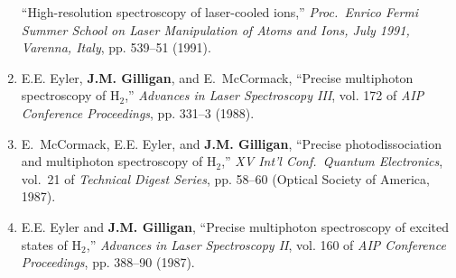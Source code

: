 \begin{enumerate}
    \enquote{High-resolution spectroscopy of laser-cooled ions,}  
    \emph{Proc.\ Enrico Fermi Summer School on Laser Manipulation of Atoms and
    Ions, {J}uly 1991, {V}arenna, {I}taly}, pp. 539--51 (1991). 
%
    \item
    E.E. Eyler, \textbf{J.M. Gilligan}, and E.~McCormack, 
    \enquote{Precise multiphoton spectroscopy of {H$_2$},}  
    \emph{Advances in Laser Spectroscopy III}, vol. 172 of \emph{AIP Conference Proceedings}, pp. 331--3 (1988). 
%
    \item
    E.~McCormack, E.E. Eyler, and \textbf{J.M. Gilligan}, 
    \enquote{Precise photodissociation and multiphoton spectroscopy of {H$_2$},}
      \emph{XV Int'l Conf.\ Quantum Electronics}, vol.~21 of \emph{Technical Digest Series}, pp. 58--60 (Optical Society of America, 1987). 
%
    \item
    E.E. Eyler and \textbf{J.M. Gilligan}, 
    \enquote{Precise multiphoton spectroscopy of excited states of {H$_2$},}
    \emph{Advances in Laser Spectroscopy II}, vol. 160 of \emph{AIP Conference Proceedings}, pp. 388--90 (1987). 
%
\end{enumerate}
